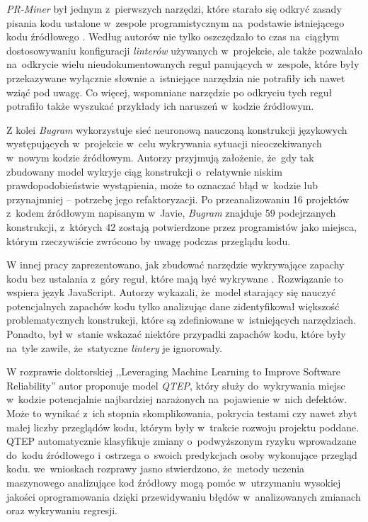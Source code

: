 \documentclass[twoside]{praca}
\begin{document}
\textit{PR-Miner} był jednym z~pierwszych narzędzi, które starało się odkryć zasady pisania kodu ustalone w~zespole programistycznym na~podstawie istniejącego kodu źródłowego \cite{li2005pr}. Według autorów nie tylko oszczędzało to czas na~ciągłym dostosowywaniu konfiguracji \textit{linterów} używanych w~projekcie, ale także pozwalało na~odkrycie wielu nieudokumentowanych reguł panujących w~zespole, które były przekazywane wyłącznie słownie a~istniejące narzędzia nie potrafiły ich nawet wziąć pod uwagę. Co więcej, wspomniane narzędzie po odkryciu tych reguł potrafiło także wyszukać przykłady ich naruszeń w~kodzie źródłowym.

Z kolei \textit{Bugram} \cite{wang2016bugram} wykorzystuje sieć neuronową nauczoną konstrukcji językowych występujących w~projekcie w~celu wykrywania sytuacji nieoczekiwanych w~nowym kodzie źródłowym. Autorzy przyjmują założenie, że~gdy tak zbudowany model wykryje ciąg konstrukcji o~relatywnie niskim prawdopodobieństwie wystąpienia, może to oznaczać błąd w~kodzie lub przynajmniej -- potrzebę jego refaktoryzacji. Po przeanalizowaniu 16 projektów z~kodem źródłowym napisanym w~Javie, \textit{Bugram} znajduje 59 podejrzanych konstrukcji, z~których 42 zostają potwierdzone przez programistów jako miejsca, którym rzeczywiście zwrócono by uwagę podczas przeglądu kodu.

W innej pracy zaprezentowano, jak zbudować narzędzie wykrywające zapachy kodu bez ustalania z~góry reguł, które mają być wykrywane \cite{bielik2017learning}. Rozwiązanie to wspiera język JavaScript. Autorzy wykazali, że~model starający się nauczyć potencjalnych zapachów kodu tylko analizując dane zidentyfikował większość problematycznych konstrukcji, które są zdefiniowane w~istniejących narzędziach. Ponadto, był w~stanie wskazać niektóre przypadki zapachów kodu, które były na~tyle zawiłe, że~statyczne \textit{lintery} je ignorowały.

W rozprawie doktorskiej ,,Leveraging Machine Learning to Improve Software Reliability'' \cite{WangSong2019} autor proponuje model \textit{QTEP}, który służy do~wykrywania miejsc w~kodzie potencjalnie najbardziej narażonych na~pojawienie w~nich defektów. Może to wynikać z~ich stopnia skomplikowania, pokrycia testami czy nawet zbyt małej liczby przeglądów kodu, którym były w~trakcie rozwoju projektu poddane. QTEP automatycznie klasyfikuje zmiany o~podwyższonym ryzyku wprowadzane do~kodu źródłowego i~ostrzega o~swoich predykcjach osoby wykonujące przegląd kodu. we~wnioskach rozprawy jasno stwierdzono, że~metody uczenia maszynowego analizujące kod źródłowy mogą pomóc w~utrzymaniu wysokiej jakości oprogramowania dzięki przewidywaniu błędów w~analizowanych zmianach oraz wykrywaniu regresji.
\end{document}
